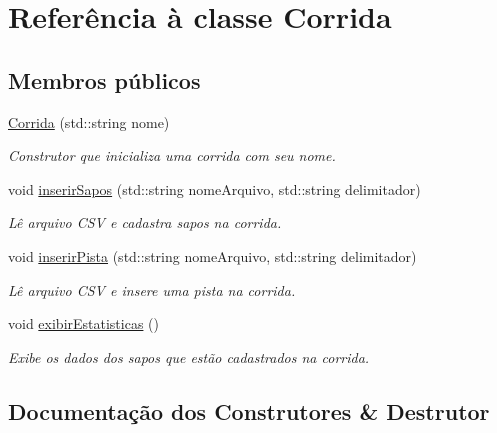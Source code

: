 \hypertarget{classCorrida}{}\section{Referência à classe Corrida}
\label{classCorrida}
\subsection*{Membros públicos}
\begin{DoxyCompactItemize}
\item 
\hyperlink{classCorrida_a007ea8b554b61d017f10d02ab1e10428}{Corrida} (std\+::string nome)
\begin{DoxyCompactList}\small\item\em Construtor que inicializa uma corrida com seu nome. \end{DoxyCompactList}\item 
void \hyperlink{classCorrida_aee79fcba9ecca389b2e31f517490fc73}{inserir\+Sapos} (std\+::string nome\+Arquivo, std\+::string delimitador)
\begin{DoxyCompactList}\small\item\em Lê arquivo C\+SV e cadastra sapos na corrida. \end{DoxyCompactList}\item 
void \hyperlink{classCorrida_a3a135667906e66adbe1a38ecdae0c048}{inserir\+Pista} (std\+::string nome\+Arquivo, std\+::string delimitador)
\begin{DoxyCompactList}\small\item\em Lê arquivo C\+SV e insere uma pista na corrida. \end{DoxyCompactList}\item 
void \hyperlink{classCorrida_a8bd6f41f4e0c7929c302feb13a01e0d5}{exibir\+Estatisticas} ()
\begin{DoxyCompactList}\small\item\em Exibe os dados dos sapos que estão cadastrados na corrida. \end{DoxyCompactList}\end{DoxyCompactItemize}


\subsection{Documentação dos Construtores \& Destrutor}
\mbox{\label{classCorrida_a007ea8b554b61d017f10d02ab1e10428}} 
